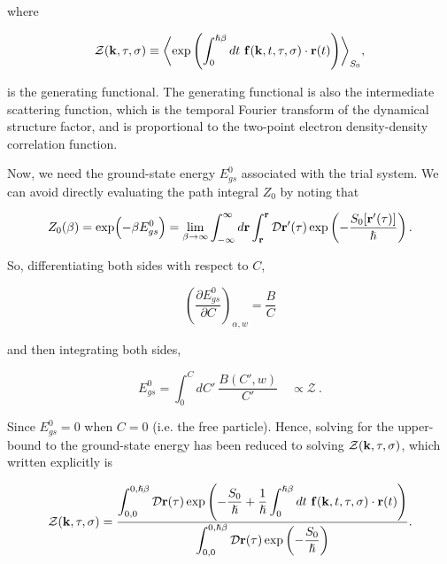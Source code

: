 where

\begin{equation}
    \mathcal{Z}(\vb{k}, \tau, \sigma) \equiv \biggl\langle \exp\left(\int_0^{\hslash\beta} dt\ \vb{f}(\vb{k}, t, \tau, \sigma) \cdot \vb{r}(t) \right) \biggr\rangle_{S_0},
\end{equation}

is the generating functional. The generating functional is also the intermediate scattering function, which is the temporal Fourier transform of the dynamical structure factor, and is proportional to the two-point electron density-density correlation function. 

Now, we need the ground-state energy $E^0_{gs}$ associated with the trial system. We can avoid directly evaluating the path integral $Z_0$ by noting that

\begin{equation}\label{eqn:trial_partition}
    Z_0(\beta) = \exp(-\beta E^0_{gs}) = \lim_{\beta \to \infty} \int^{\infty}_{-\infty} d\vb{r} \int^{\vb{r}}_{\vb{r}} \mathcal{D}\vb{r'}(\tau) \exp\left(-\frac{S_0[\vb{r'}(\tau)]}{\hslash}\right).
\end{equation}

So, differentiating both sides with respect to $C$,

\begin{equation}
     \left( \frac{\partial E_{gs}^0}{\partial C}\right)_{\alpha, w} = \frac{B}{C}
\end{equation}

and then integrating both sides,

\begin{equation}
    E^{0}_{gs} = \int^{C}_0 dC'\ \frac{B(C', w)}{C'} \quad \propto \mathcal{Z} \ .
\end{equation}

Since $ E^{0}_{gs} = 0$ when $C = 0$ (i.e. the free particle). Hence, solving for the upper-bound to the ground-state energy has been reduced to solving $\mathcal{Z}(\vb{k}, \tau, \sigma)$, which written explicitly is

\begin{equation}\label{eqn:gen_func}
    \mathcal{Z}(\vb{k}, \tau, \sigma) = \frac{\displaystyle \int^{0, \hslash\beta}_{0,0} \mathcal{D}\vb{r}(\tau) \exp\left(-\frac{S_0}{\hslash} +  \frac{1}{\hslash}\int^{\hslash\beta}_0 dt\ \vb{f}(\vb{k}, t, \tau, \sigma) \cdot \vb{r}(t) \right)}{\displaystyle \int^{0, \hslash\beta}_{0, 0} \mathcal{D}\vb{r}(\tau) \exp\left(-\frac{S_0}{\hslash}\right)}.
\end{equation}

